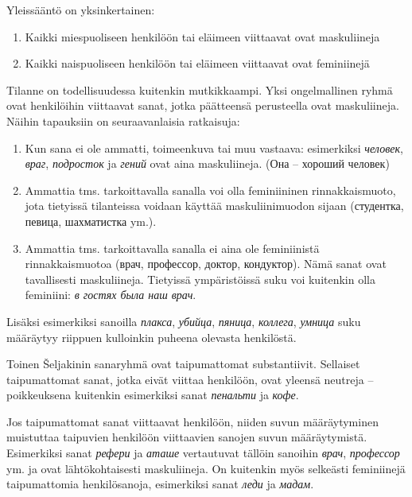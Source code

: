\documentclass[]{scrartcl}
\providecommand{\tightlist}{%
  \setlength{\itemsep}{0pt}\setlength{\parskip}{0pt}}
\begin{document}
Yleissääntö on yksinkertainen:

\begin{enumerate}
\def\labelenumi{\arabic{enumi}.}
\tightlist
\item
  Kaikki miespuoliseen henkilöön tai eläimeen viittaavat ovat
  maskuliineja
\item
  Kaikki naispuoliseen henkilöön tai eläimeen viittaavat ovat
  feminiinejä
\end{enumerate}

Tilanne on todellisuudessa kuitenkin mutkikkaampi. Yksi ongelmallinen
ryhmä ovat henkilöihin viittaavat sanat, jotka päätteensä perusteella
ovat maskuliineja. Näihin tapauksiin on seuraavanlaisia ratkaisuja:

\begin{enumerate}
\def\labelenumi{\arabic{enumi}.}
\tightlist
\item
  Kun sana ei ole ammatti, toimeenkuva tai muu vastaava: esimerkiksi
  \emph{человек}, \emph{враг}, \emph{подросток} ja \emph{гений} ovat
  aina maskuliineja. (Она -- хороший человек)
\item
  Ammattia tms. tarkoittavalla sanalla voi olla feminiininen
  rinnakkaismuoto, jota tietyissä tilanteissa voidaan käyttää
  maskuliinimuodon sijaan (студентка, певица, шахматистка ym.).
\item
  Ammattia tms. tarkoittavalla sanalla ei aina ole feminiinistä
  rinnakkaismuotoa (врач, профессор, доктор, кондуктор). Nämä sanat ovat
  tavallisesti maskuliineja. Tietyissä ympäristöissä suku voi kuitenkin
  olla feminiini: \emph{в гостях была наш врач}.
\end{enumerate}

Lisäksi esimerkiksi sanoilla \emph{плакса}, \emph{убийца},
\emph{пяница}, \emph{коллега}, \emph{умница} suku määräytyy riippuen
kulloinkin puheena olevasta henkilöstä.

Toinen Šeljakinin sanaryhmä ovat taipumattomat substantiivit. Sellaiset
taipumattomat sanat, jotka eivät viittaa henkilöön, ovat yleensä
neutreja -- poikkeuksena kuitenkin esimerkiksi sanat \emph{пенальти} ja
\emph{кофе}.

Jos taipumattomat sanat viittaavat henkilöön, niiden suvun määräytyminen
muistuttaa taipuvien henkilöön viittaavien sanojen suvun määräytymistä.
Esimerkiksi sanat \emph{рефери} ja \emph{аташе} vertautuvat tällöin
sanoihin \emph{врач}, \emph{профессор} ym. ja ovat lähtökohtaisesti
maskuliineja. On kuitenkin myös selkeästi feminiinejä taipumattomia
henkilösanoja, esimerkiksi sanat \emph{леди} ja \emph{мадам}.
\end{document}
